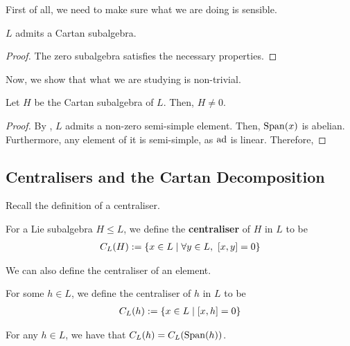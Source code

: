 First of all, we need to make sure what we are doing is sensible.

\begin{lemma}
    $L$ admits a Cartan subalgebra.
\end{lemma}
\begin{proof}
    The zero subalgebra satisfies the necessary properties. %
\end{proof}

Now, we show that what we are studying is non-trivial.

\begin{boxproposition}
    Let $H$ be the Cartan subalgebra of $L$. Then, $H \neq 0$.
\end{boxproposition}
\begin{proof}
    By , $L$ admits a non-zero semi-simple element. Then, $\operatorname{Span}\!\left( x \right)$ is abelian. Furthermore, any element of it is semi-simple, as $\operatorname{ad}$ is linear. Therefore, \sorry
\end{proof}

\subsection{Centralisers and the Cartan Decomposition}

Recall the definition of a centraliser. %

\begin{boxdefinition}
    For a Lie subalgebra $H \leq L$, we define the \textbf{centraliser} of $H$ in $L$ to be
    \begin{align*}
        C_L(H) := \left\{ x \in L \; \middle\vert \; \forall y \in L, \ \left[ x, y \right] = 0 \right\}
    \end{align*}
\end{boxdefinition}

We can also define the centraliser of an element.

\begin{boxdefinition}
    For some $h \in L$, we define the centraliser of $h$ in $L$ to be
    \begin{align*}
        C_L(h) := \left\{ x \in L \; \middle\vert \; \left[ x, h \right] = 0 \right\}
    \end{align*}
\end{boxdefinition}


\begin{lemma}
    For any $h \in L$, we have that $C_L(h) = C_L\!\left( \operatorname{Span}\!\left( h \right) \right)$.
\end{lemma}


